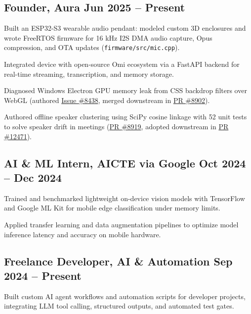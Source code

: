 
\subsection[Founder, Aura]{{Founder}, Aura \hfill Jun 2025 -- Present}
\begin{zitemize}
\item Built an ESP32-S3 wearable audio pendant: modeled custom 3D enclosures and wrote FreeRTOS firmware for 16 kHz I2S DMA audio capture, Opus compression, and OTA updates (\texttt{firmware/src/mic.cpp}).
\item Integrated device with open-source Omi ecosystem via a FastAPI backend for real-time streaming, transcription, and memory storage.
\item Diagnosed Windows Electron GPU memory leak from CSS backdrop filters over WebGL (authored \href{https://github.com/BasedHardware/omi/issues/8438}{Issue \#8438}, merged downstream in \href{https://github.com/BasedHardware/omi/pull/8902}{PR \#8902}).
\item Authored offline speaker clustering using SciPy cosine linkage with 52 unit tests to solve speaker drift in meetings (\href{https://github.com/BasedHardware/omi/pull/8919}{PR \#8919}, adopted downstream in \href{https://github.com/BasedHardware/omi/pull/12471}{PR \#12471}).
\end{zitemize}

\subsection[AI and ML Intern, AICTE via Google]{{AI \& ML Intern}, AICTE via Google \hfill Oct 2024 -- Dec 2024}
\begin{zitemize}
\item Trained and benchmarked lightweight on-device vision models with TensorFlow and Google ML Kit for mobile edge classification under memory limits.
\item Applied transfer learning and data augmentation pipelines to optimize model inference latency and accuracy on mobile hardware.
\end{zitemize}

\subsection[Freelance Developer, AI and Automation]{{Freelance Developer}, AI \& Automation \hfill Sep 2024 -- Present}
\begin{zitemize}
\item Built custom AI agent workflows and automation scripts for developer projects, integrating LLM tool calling, structured outputs, and automated test gates.
\end{zitemize}
\vspace{-0.3em}
